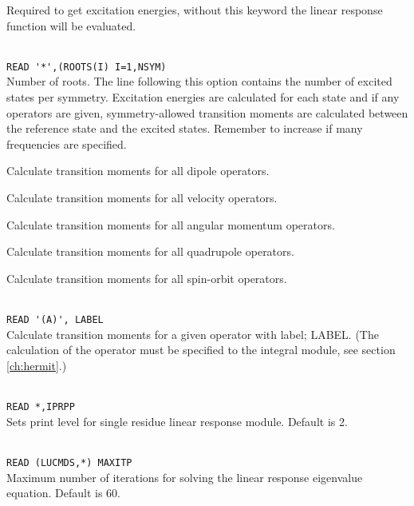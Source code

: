 \begin{description}

\item{} Required to get excitation energies, without
this keyword the linear response function will be evaluated.

\item{}\\
\verb|READ '*',(ROOTS(I) I=1,NSYM)|\\
Number of roots.  The line following this option contains the number
of excited states per symmetry. Excitation
energies are calculated for each state and if
any operators are given, 
symmetry-allowed transition moments are
calculated between the 
reference state and the excited states.
Remember to increase  if many frequencies are specified.

\item{}
Calculate transition moments for all dipole operators.

\item{}
Calculate transition moments for all velocity operators.

\item{}
Calculate transition moments for all angular momentum operators.

\item{}
Calculate transition moments for all quadrupole operators.

\item{}
Calculate transition moments for all spin-orbit operators.

\item{}\\
\verb|READ '(A)', LABEL|\\
Calculate transition moments for a given operator with label; LABEL.
(The calculation of the operator must be specified to the integral
module, see section \ref{ch:hermit}.)

\item{}\\
\verb|READ *,IPRPP|\\
Sets print level for single residue linear response module. Default is 2.

\item{}\\
\verb|READ (LUCMDS,*) MAXITP|\\
Maximum number of iterations for solving the linear response eigenvalue
equation. Default is 60.


\end{description}
